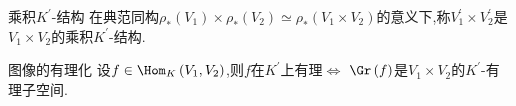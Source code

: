 \begin{definition}{乘积$K^{\prime}$-结构}{}
	在典范同构$\rho_{\ast}\left(V_{1}\right)\times\rho_{\ast}\left(V_{2}\right)\simeq\rho_{\ast}\left(V_{1}\times V_{2}\right)$的意义下,称$V_{1}^{\prime}\times V_{2}^{\prime}$是$V_{1}\times V_{2}$的乘积$K^{\prime}$-结构.
\end{definition}

\begin{proposition}{图像的有理化}{}
	设$f\in\Hom_{K}\left(V_{1},V_{2}\right)$,则$f$在$K^{\prime}$上有理$\iff$ $\Gr\left(f\right)$是$V_{1}\times V_{2}$的$K^{\prime}$-有理子空间.
\end{proposition}